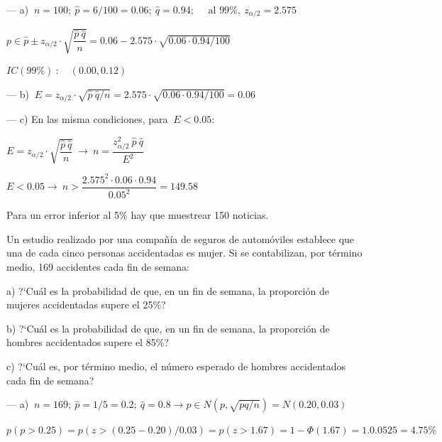 \vspace{2mm} --- a) $\ n=100;\ \hat p=6/100=0.06; \ \hat q=0.94 ; \quad \text{ al } 99\%,\ z_{\alpha/2}=2.575$

\vspace{2mm} $p\in \hat p \pm z_{\alpha/2}\cdot \sqrt{\dfrac{\hat p \ \hat q}{n}} =0.06-2.575\cdot \sqrt{0.06\cdot 0.94/100}$

\vspace{2mm} $IC(99\%)\ : \quad (0.00, 0.12)$ 

\vspace{2mm} --- b) $\ E=z_{\alpha/2}\cdot \sqrt{\hat p \ \hat q /n}=2.575\cdot  \sqrt{0.06\cdot 0.94/100}=0.06$

\vspace{2mm} --- c) En las misma condiciones, para $\ E<0.05$:

\vspace{2mm} $E=z_{\alpha/2}\cdot \sqrt{\dfrac{\hat p \ \hat q}{n}} \ \to \  n=\dfrac{z_{\alpha/2}^2\ \hat p \ \hat q}{E^2}$

\vspace{2mm} $E<0.05 \to \ n>\dfrac{2.575^2\cdot 0.06\cdot 0.94}{0.05^2}=149.58$  

\vspace{2mm} Para un error inferior al 5\% hay que muestrear 150 noticias.


\vspace{5mm} %
\begin{ejemplo}
\begin{ejer}
	Un estudio realizado por una compañía de seguros de automóviles establece que una de cada cinco personas accidentadas es mujer. Si se contabilizan, por término medio, 169 accidentes cada fin de semana: 

a) ?`Cuál es la probabilidad de que, en un fin de semana, la proporción de mujeres accidentadas supere el 25\%?  

b) ?`Cuál es la probabilidad de que, en un fin de semana, la proporción de hombres accidentados supere el 85\%? 

c) ?`Cuál es, por término medio, el número esperado de hombres accidentados cada fin de semana? 
\end{ejer}	
\end{ejemplo}

\vspace{2mm} --- a) $\ n=169;\ \hat p=1/5=0.2;\ \hat q=0.8 \to p\in N(p,\sqrt{pq/n})=N(0.20,0.03)$

\vspace{2mm} $p(p>0.25)=p(z>(0.25-0.20)/0.03)=p(z>1.67)=1-\Phi(1.67)=1.0.0525=4.75\%$

